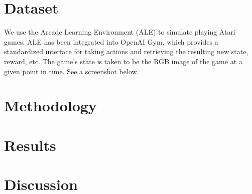\documentclass[10pt, twocolumn]{article}
\begin{document}
\section{Dataset}
We use the Arcade Learning Environment (ALE) to simulate playing Atari games. ALE has been integrated
into OpenAI Gym, which provides a standardized interface for taking actions and retrieving the resulting new
state, reward, etc. The game's state is taken to be the RGB image of the game at a given point in time. See
a screenshot below.

\section{Methodology}

\section{Results}

\section{Discussion}
\end{document}

